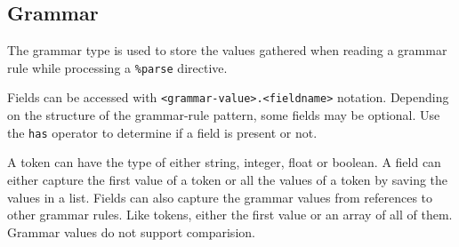 
\subsection{Grammar}
{
	The grammar type is used to store the values
	gathered when reading a grammar rule while processing a \texttt{\%parse}
	directive.
	
	Fields can be accessed with \texttt{<grammar-value>.<fieldname>} notation.
	Depending on the structure of the grammar-rule pattern, some fields
	may be optional. Use the \texttt{has} operator to determine if a field
	is present or not.
	
	A token can have the type of either string, integer, float or boolean.
	A field can either capture the first value of a token or all the values
	of a token by saving the values in a list.
	Fields can also capture the grammar values from references to other
	grammar rules. Like tokens, either the first value or an array of all
	of them.
	Grammar values do not support comparision.
}
